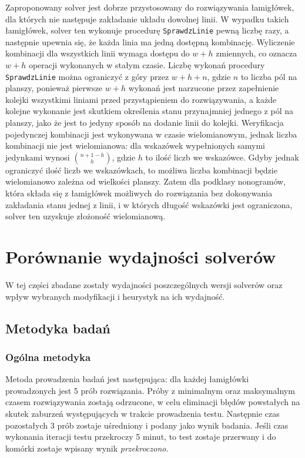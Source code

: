     Zaproponowany solver jest dobrze przystosowany do rozwiązywania łamigłówek, dla których nie
następuje zakładanie układu dowolnej linii. W wypadku takich łamigłówek, solver ten wykonuje procedurę
\texttt{SprawdzLinie} pewną liczbę razy, a następnie upewnia się, że każda linia ma jedną dostępną
kombinację. Wyliczenie kombinacji dla wszystkich linii wymaga dostępu do $w+h$ zmiennych, co oznacza $w+h$ operacji
wykonanych w stałym czasie. Liczbę wykonań procedury \texttt{SprawdzLinie} można ograniczyć z góry
przez $w+h+n$, gdzie $n$ to liczba pól na planszy, ponieważ pierwsze $w+h$ wykonań jest narzucone 
przez zapełnienie kolejki wszystkimi liniami przed przystąpieniem do rozwiązywania, a każde kolejne
wykonanie jest skutkiem określenia stanu przynajmniej jednego z pól na planszy, jako że jest to 
jedyny sposób na dodanie linii do kolejki. Weryfikacja pojedynczej kombinacji jest wykonywana w
czasie wielomianowym, jednak liczba kombinacji nie jest wielomianowa: dla wskazówek wypełnionych
samymi jedynkami wynosi
${n + 1 - h} \choose h$, gdzie $h$ to ilość liczb we wskazówce. Gdyby jednak ograniczyć ilość
liczb we wskazówkach, to możliwa liczba kombinacji będzie wielomianowo zależna od wielkości planszy.
Zatem dla podklasy nonogramów, która składa się z łamigłówek możliwych do rozwiązania bez dokonywania
zakładania stanu jednej z linii, i w których długość wskazówki jest ograniczona, solver ten
uzyskuje złożoność wielomianową.



\section{Porównanie wydajności solverów}
    W tej części zbadane zostały wydajności poszczególnych wersji solverów oraz wpływ wybranych
modyfikacji i heurystyk na ich wydajność.

\subsection{Metodyka badań}\label{metodyka}

\subsubsection{Ogólna metodyka}
    Metoda prowadzenia badań jest następująca: dla każdej łamigłówki prowadzonych jest 5 prób 
rozwiązania. Próby z minimalnym oraz maksymalnym czasem rozwiązywania zostają odrzucone, w celu
eliminacji błędów powstałych na skutek zaburzeń występujących w trakcie prowadzenia testu. Następnie
czas pozostałych 3 prób zostaje uśredniony i podany jako wynik badania. Jeśli czas wykonania
iteracji testu przekroczy 5 minut, to test zostaje przerwany i do komórki zostaje wpisany wynik
\textit{przekroczono}.


